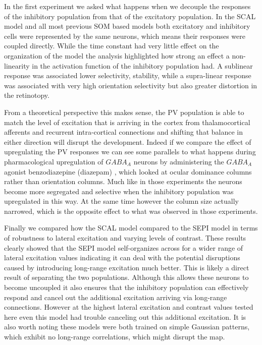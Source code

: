 In the first experiment we asked what happens when we decouple the
responses of the inhibitory population from that of the excitatory
population. In the SCAL model and all most previous SOM based models
both excitatory and inhibitory cells were represented by the same
neurons, which means their responses were coupled directly. While the
time constant had very little effect on the organization of the model
the analysis highlighted how strong an effect a non-linearity in the
activation function of the inhibitory population had. A sublinear
response was associated lower selectivity, stability, while a
supra-linear response was associated with very high orientation
selectivity but also greater distortion in the retinotopy.

From a theoretical perspective this makes sense, the PV population is
able to match the level of excitation that is arriving in the cortex
from thalamocortical afferents and recurrent intra-cortical
connections and shifting that balance in either direction will disrupt
the development. Indeed if we compare the effect of upregulating the
PV responses we can see some parallels to what happens during
pharmacological upregulation of $GABA_A$ neurons by administering the
$GABA_A$ agonist benzodiazepine (diazepam)
\citep{Fagiolini2004,Hensch2004}, which looked at ocular dominance
columns rather than orientation columns. Much like in those
experiments the neurons become more segregated and selective when the
inhibitory population was upregulated in this way. At the same time
however the column size actually narrowed, which is the opposite
effect to what was observed in those experiments.

Finally we compared how the SCAL model compared to the SEPI model in
terms of robustness to lateral excitation and varying levels of
contrast. These results clearly showed that the SEPI model
self-organizes across for a wider range of lateral excitation values
indicating it can deal with the potential disruptions caused by
introducing long-range excitation much better. This is likely a direct
result of separating the two populations. Although this allows these
neurons to become uncoupled it also ensures that the inhibitory
population can effectively respond and cancel out the additional
excitation arriving via long-range connections. However at the highest
lateral excitation and contrast values tested here even this model had
trouble canceling out this additional excitation. It is also worth
noting these models were both trained on simple Gaussian patterns,
which exhibit no long-range correlations, which might disrupt the map.

